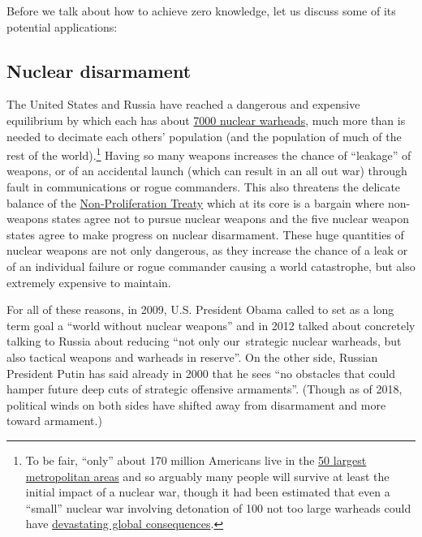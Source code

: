 Before we talk about how to achieve zero knowledge, let us discuss some
of its potential applications:

\subsection{Nuclear disarmament}\label{13-Nuclear-disarmament}

The United States and Russia have reached a dangerous and expensive
equilibrium by which each has about
\href{https://www.armscontrol.org/factsheets/Nuclearweaponswhohaswhat}{7000
nuclear warheads}, much more than is needed to decimate each others'
population (and the population of much of the rest of the
world).\footnote{To be fair, ``only'' about 170 million Americans live
  in the
  \href{https://www.currentresults.com/Weather-Extremes/US/largest-cities-list.php}{50
  largest metropolitan areas} and so arguably many people will survive
  at least the initial impact of a nuclear war, though it had been
  estimated that even a ``small'' nuclear war involving detonation of
  100 not too large warheads could have
  \href{http://onlinelibrary.wiley.com/doi/10.1002/2013EF000205/full}{devastating
  global consequences}.} Having so many weapons increases the chance of
``leakage'' of weapons, or of an accidental launch (which can result in
an all out war) through fault in communications or rogue commanders.
This also threatens the delicate balance of the
\href{https://en.wikipedia.org/wiki/Treaty_on_the_Non-Proliferation_of_Nuclear_Weapons}{Non-Proliferation
Treaty} which at its core is a bargain where non-weapons states agree
not to pursue nuclear weapons and the five nuclear weapon states agree
to make progress on nuclear disarmament. These huge quantities of
nuclear weapons are not only dangerous, as they increase the chance of a
leak or of an individual failure or rogue commander causing a world
catastrophe, but also extremely expensive to maintain.

For all of these reasons, in 2009, U.S. President Obama called to set as
a long term goal a ``world without nuclear weapons'' and in 2012 talked
about concretely talking to Russia about reducing ``not only
our~strategic nuclear warheads, but also tactical weapons and warheads
in reserve''. On the other side, Russian President Putin has said
already in 2000 that he sees ``no obstacles that could hamper future
deep cuts of strategic offensive armaments''. (Though as of 2018,
political winds on both sides have shifted away from disarmament and
more toward armament.)

